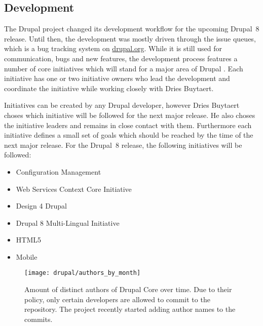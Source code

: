 
\subsection{Development} %

The Drupal project changed its development workflow for the upcoming Drupal~8
release. Until then, the development was mostly driven through the issue
queues, which is a bug tracking system on \url{drupal.org}. While it is still
used for communication, bugs and new features, the development process features
a number of core initiatives which will stand for a major area of Drupal
\cite{DrupalInitiatives}. Each initiative has one or two initiative owners who
lead the development and coordinate the initiative while working closely with
Dries Buytaert.

Initiatives can be created by any Drupal developer, however Dries Buytaert
choses which initiative will be followed for the next major release. He also
choses the initiative leaders and remains in close contact with them.
Furthermore each initiative defines a small set of goals which should be
reached by the time of the next major release. For the Drupal~8 release, the
following initiatives will be followed:

\begin{itemize}
  \item Configuration Management
  \item Web Services Context Core Initiative
  \item Design 4 Drupal
  \item Drupal 8 Multi-Lingual Initiative
  \item HTML5
  \item Mobile
\end{itemize}

\begin{figure}[htbp]
  \centering
  \texttt{[image: drupal/authors\_by\_month]}
  \caption[Authors by Month, Drupal]
  {Amount of distinct authors of Drupal Core over time. Due to their policy,
    only certain developers are allowed to commit to the repository. The
    project recently started adding author names to the commits.}
  \label{fig:drupal:abm}
\end{figure}


